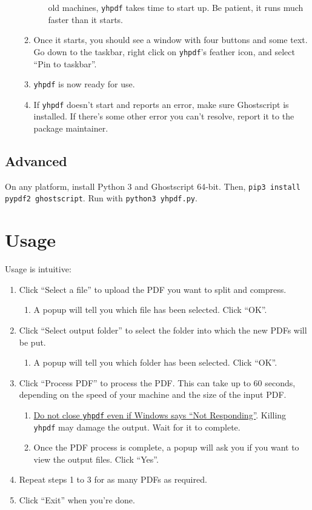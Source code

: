 \documentclass[9pt]{report}
\begin{document}
\begin{enumerate}
\begin{enumerate}
\begin{enumerate}
old machines, \texttt{yhpdf} takes time to start up. Be patient, it
runs much faster than it starts.
\end{enumerate}
\item Once it starts, you should see a window with four buttons and
some text. Go down to the taskbar, right click on \texttt{yhpdf}'s
feather icon, and select ``Pin to taskbar''.
\item \texttt{yhpdf} is now ready for use.
\item If \texttt{yhpdf} doesn't start and reports an error, make sure
Ghostscript is installed. If there's some other error you
can't resolve, report it to the package maintainer.
\end{enumerate}
\end{enumerate}

\section{Advanced}
\label{sec:org01acafc}

On any platform, install Python 3 and Ghostscript 64-bit. Then,
\texttt{pip3 install pypdf2 ghostscript}. Run with \texttt{python3 yhpdf.py}.

\chapter{Usage}
\label{sec:org05ef3be}

Usage is intuitive:

\begin{enumerate}
\item Click ``Select a file'' to upload the PDF you want to split and
compress.
\begin{enumerate}
\item A popup will tell you which file has been selected.
Click ``OK''.
\end{enumerate}
\item Click ``Select output folder'' to select the folder into which the
new PDFs will be put.
\begin{enumerate}
\item A popup will tell you which folder has been selected. Click
``OK''.
\end{enumerate}
\item Click ``Process PDF'' to process the PDF. This can take up to 60
seconds, depending on the speed of your machine and the size of
the input PDF.
\begin{enumerate}
\item \uline{Do not close \texttt{yhpdf} even if Windows says ``Not Responding''}.
Killing \texttt{yhpdf} may damage the output. Wait for it to
complete.
\item Once the PDF process is complete, a popup will ask you if you
want to view the output files. Click ``Yes''.
\end{enumerate}
\item Repeat steps 1 to 3 for as many PDFs as required.
\item Click ``Exit'' when you're done.
\end{enumerate}
\end{document}
